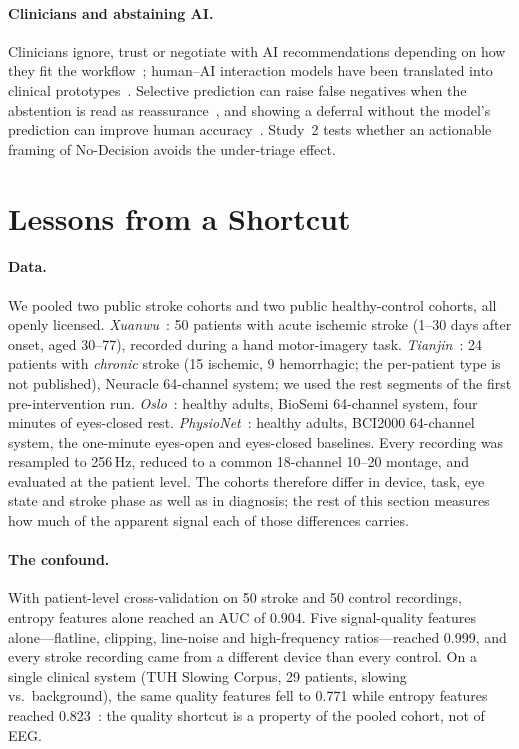 \documentclass[sigconf,review,anonymous]{acmart}
\begin{document}
\paragraph{Clinicians and abstaining AI.}
Clinicians ignore, trust or negotiate with AI recommendations depending on how they fit the workflow~\cite{sivaraman2023}; human--AI interaction models have been translated into clinical prototypes~\cite{hussain2024}.
Selective prediction can raise false negatives when the abstention is read as reassurance~\cite{jabbour2025}, and showing a deferral without the model's prediction can improve human accuracy~\cite{bondi2022}.
Study~2 tests whether an actionable framing of No-Decision avoids the under-triage effect.

\section{Lessons from a Shortcut}
\label{sec:lessons}

\paragraph{Data.}
We pooled two public stroke cohorts and two public healthy-control cohorts, all openly licensed.
\emph{Xuanwu}~\cite{dataset_xuanwu}: 50 patients with acute ischemic stroke (1--30 days after onset, aged 30--77), recorded during a hand motor-imagery task.
\emph{Tianjin}~\cite{dataset_tianjin}: 24 patients with \emph{chronic} stroke (15 ischemic, 9 hemorrhagic; the per-patient type is not published), Neuracle 64-channel system; we used the rest segments of the first pre-intervention run.
\emph{Oslo}~\cite{dataset_oslo}: healthy adults, BioSemi 64-channel system, four minutes of eyes-closed rest.
\emph{PhysioNet}~\cite{dataset_eegmmidb,schalk2004,goldberger2000}: healthy adults, BCI2000 64-channel system, the one-minute eyes-open and eyes-closed baselines.
Every recording was resampled to 256\,Hz, reduced to a common 18-channel 10--20 montage, and evaluated at the patient level.
The cohorts therefore differ in device, task, eye state and stroke phase as well as in diagnosis; the rest of this section measures how much of the apparent signal each of those differences carries.

\paragraph{The confound.}
With patient-level cross-validation on 50 stroke and 50 control recordings, entropy features alone reached an AUC of 0.904. Five signal-quality features alone---flatline, clipping, line-noise and high-frequency ratios---reached 0.999, and every stroke recording came from a different device than every control.
On a single clinical system (TUH Slowing Corpus, 29 patients, slowing vs.\ background), the same quality features fell to 0.771 while entropy features reached 0.823~\cite{obeid2016tuh}: the quality shortcut is a property of the pooled cohort, not of EEG.
\end{document}

